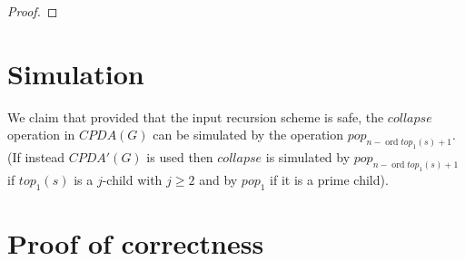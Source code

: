 \documentclass{article}
\newcommand{\ord}{\mathop{\mathrm{ord}}}
\theoremstyle{remark}
\theoremstyle{definition}
\begin{document}
\begin{proof}
\end{proof}





\section{Simulation}

We claim that provided that the input recursion scheme is safe, the
$collapse$ operation in $CPDA(G)$ can be simulated by the operation
$pop_{n-\ord{top_1(s)}+1}$. (If instead $CPDA'(G)$ is used then
$collapse$ is simulated by $pop_{n-\ord{top_1(s)}+1}$ if $top_1(s)$
is a $j$-child with $j\geq 2$ and by $pop_1$ if it is a prime
child).

\section{Proof of correctness}
\end{document}
